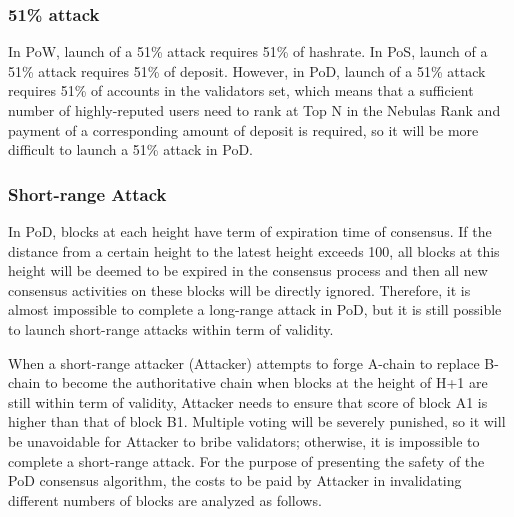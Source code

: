 
\subsubsection*{51\% attack}
\label{pod:economic:fraud:51attack}

In PoW, launch of a 51\% attack requires 51\% of hashrate. In PoS, launch of a 51\% attack requires 51\% of deposit. However, in PoD, launch of a 51\% attack requires 51\% of accounts in the validators set, which means that a sufficient number of highly-reputed users need to rank at Top N in the Nebulas Rank and payment of a corresponding amount of deposit is required, so it will be more difficult to launch a 51\% attack in PoD.


\subsubsection*{Short-range Attack}
\label{pod:economic:fraud:short_range_attack}

In PoD, blocks at each height have term of expiration time of consensus. If the distance from a certain height to the latest height exceeds 100, all blocks at this height will be deemed to be expired in the consensus process and then all new consensus activities on these blocks will be directly ignored. Therefore, it is almost impossible to complete a long-range attack in PoD, but it is still possible to launch short-range attacks within term of validity.


When a short-range attacker (Attacker) attempts to forge A-chain to replace B-chain to become the authoritative chain when blocks at the height of H+1 are still within term of validity, Attacker needs to ensure that score of block A1 is higher than that of block B1. Multiple voting will be severely punished, so it will be unavoidable for Attacker to bribe validators; otherwise, it is impossible to complete a short-range attack. For the purpose of presenting the safety of the PoD consensus algorithm, the costs to be paid by Attacker in invalidating different numbers of blocks are analyzed as follows.

